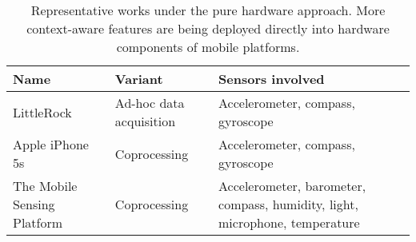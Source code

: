 \begin{table}[t]
    \centering
    \scriptsize{}
    \begin{tabular}{C{0.25\columnwidth}C{0.2\columnwidth}C{0.4\columnwidth}}
    \toprule
    \textbf{Name} & \textbf{Variant} & \textbf{Sensors involved} \\
    \midrule
    LittleRock \cite{Priyantha2011} & Ad-hoc data acquisition &  Accelerometer, compass, gyroscope \\
    
    Apple iPhone 5s \cite{Apple2015} & Coprocessing & Accelerometer, compass, gyroscope \\

    The Mobile Sensing Platform \cite{Choudhury2008} & Coprocessing & Accelerometer, barometer, compass, humidity, light, microphone, temperature \\
    \bottomrule
    \end{tabular}
    \protect\caption{Representative works under the pure hardware approach. More context-aware features are being deployed directly into hardware components of mobile platforms.\label{tab:works-hardware-approach}}
\end{table}
